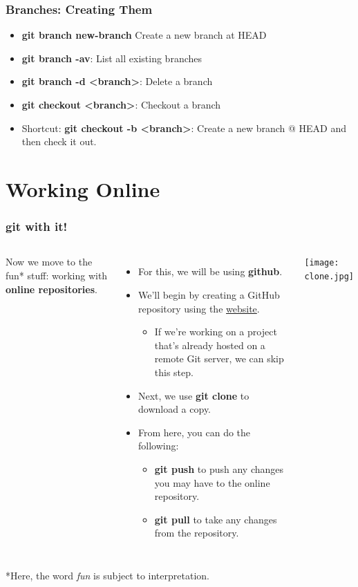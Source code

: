\documentclass{beamer}
\begin{document}
\begin{frame}[fragile]
\frametitle{Branches: Creating Them}
\begin{itemize}
\item \textbf{git branch \textlangle{} new-branch \textrangle{} } Create a new branch at HEAD
\item \textbf{git branch -av}: List all existing branches
\item \textbf{git branch -d <branch>}: Delete a branch
\item \textbf{git checkout <branch>}: Checkout a branch
\item Shortcut: \textbf{git checkout -b <branch>}: Create a new branch @ HEAD and then check it out.
\end{itemize}
\end{frame}

\section{Working Online}

\begin{frame}
\frametitle{\textbf{git} with it!}
\begin{columns}
Now we move to the fun* stuff: working with \textbf{online repositories}.
\begin{itemize}
\item For this, we will be using \textbf{github}.
\item We'll begin by creating a GitHub repository using the \href{www.github.com}{website}.
\begin{itemize}
\item If we're working on a project that's already hosted on a remote Git server, we can skip this step.
\end{itemize}
\item Next, we use \textbf{git clone} to download a copy.
\item From here, you can do the following:
\begin{itemize}
\item \textbf{git push} to push any changes you may have to the online repository.
\item \textbf{git pull} to take any changes from the repository.
\end{itemize}
\end{itemize}
\texttt{[image: clone.jpg]}
\end{columns}

*Here, the word \textit{fun} is subject to interpretation.
\end{frame}
\end{document}
